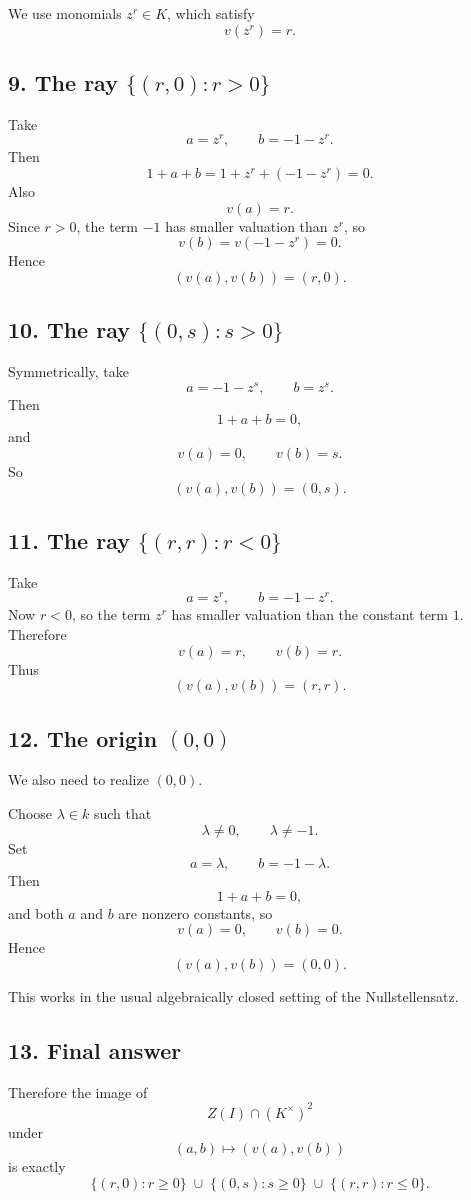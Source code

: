 \documentclass[12pt,a4paper]{article}
\theoremstyle{notespace}
\begin{document}
We use monomials \(z^r\in K\), which satisfy
\[
v(z^r)=r.
\]

\subsection{9. The ray \(\{(r,0): r>0\}\)}

Take
\[
a=z^r,
\qquad
b=-1-z^r.
\]
Then
\[
1+a+b=1+z^r+(-1-z^r)=0.
\]
Also
\[
v(a)=r.
\]
Since \(r>0\), the term \(-1\) has smaller valuation than \(z^r\), so
\[
v(b)=v(-1-z^r)=0.
\]
Hence
\[
(v(a),v(b))=(r,0).
\]

\subsection{10. The ray \(\{(0,s): s>0\}\)}

Symmetrically, take
\[
a=-1-z^s,
\qquad
b=z^s.
\]
Then
\[
1+a+b=0,
\]
and
\[
v(a)=0,
\qquad
v(b)=s.
\]
So
\[
(v(a),v(b))=(0,s).
\]

\subsection{11. The ray \(\{(r,r): r<0\}\)}

Take
\[
a=z^r,
\qquad
b=-1-z^r.
\]
Now \(r<0\), so the term \(z^r\) has smaller valuation than the constant term \(1\). Therefore
\[
v(a)=r,
\qquad
v(b)=r.
\]
Thus
\[
(v(a),v(b))=(r,r).
\]

\subsection{12. The origin \((0,0)\)}

We also need to realize \((0,0)\).

Choose \(\lambda\in k\) such that
\[
\lambda\neq 0,
\qquad
\lambda\neq -1.
\]
Set
\[
a=\lambda,
\qquad
b=-1-\lambda.
\]
Then
\[
1+a+b=0,
\]
and both \(a\) and \(b\) are nonzero constants, so
\[
v(a)=0,
\qquad
v(b)=0.
\]
Hence
\[
(v(a),v(b))=(0,0).
\]

This works in the usual algebraically closed setting of the Nullstellensatz.

\subsection{13. Final answer}

Therefore the image of
\[
Z(I)\cap (K^\times)^2
\]
under
\[
(a,b)\mapsto (v(a),v(b))
\]
is exactly
\[
\boxed{
	\{(r,0): r\ge 0\}
	\;\cup\;
	\{(0,s): s\ge 0\}
	\;\cup\;
	\{(r,r): r\le 0\}
}.
\]
\end{document}
